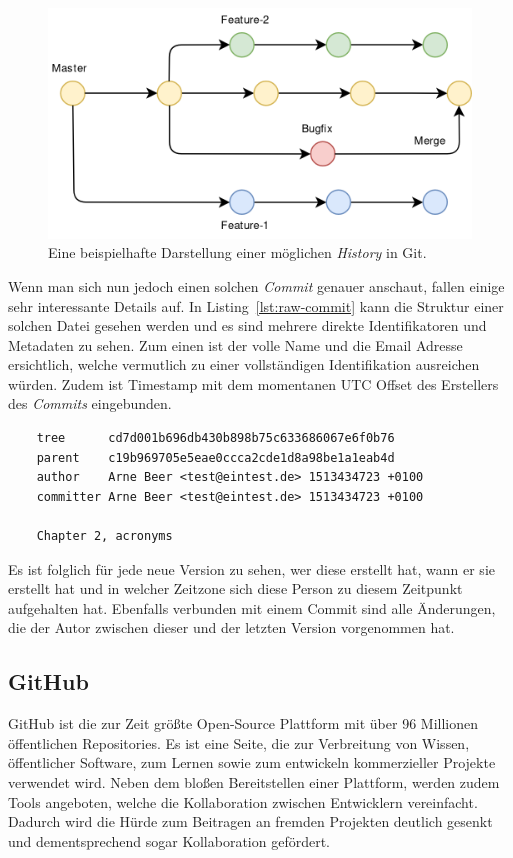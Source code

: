 \documentclass[12pt,a4paper]{scrartcl}
\begin{document}
\begin{figure}[H]
    \includegraphics[scale=0.25]{./gfx/git-history-branch.png}
    \centering
    \caption{Eine beispielhafte Darstellung einer möglichen \emph{History} in Git.}\label{fig:git-history}
\end{figure}

Wenn man sich nun jedoch einen solchen \emph{Commit} genauer anschaut, fallen einige sehr interessante Details auf.
In Listing~\ref{lst:raw-commit} kann die Struktur einer solchen Datei gesehen werden und es sind mehrere direkte Identifikatoren und Metadaten zu sehen.
Zum einen ist der volle Name und die Email Adresse ersichtlich, welche vermutlich zu einer vollständigen Identifikation ausreichen würden.
Zudem ist Timestamp mit dem momentanen UTC Offset des Erstellers des \emph{Commits} eingebunden.

\begin{verbatim}
    tree      cd7d001b696db430b898b75c633686067e6f0b76
    parent    c19b969705e5eae0ccca2cde1d8a98be1a1eab4d
    author    Arne Beer <test@eintest.de> 1513434723 +0100
    committer Arne Beer <test@eintest.de> 1513434723 +0100

    Chapter 2, acronyms
\end{verbatim}
\begingroup
{}
\endgroup

Es ist folglich für jede neue Version zu sehen, wer diese erstellt hat, wann er sie erstellt hat und in welcher Zeitzone sich diese Person zu diesem Zeitpunkt aufgehalten hat.
Ebenfalls verbunden mit einem Commit sind alle Änderungen, die der Autor zwischen dieser und der letzten Version vorgenommen hat.


\subsection{GitHub}
GitHub ist die zur Zeit größte Open-Source Plattform mit über 96 Millionen öffentlichen Repositories.
Es ist eine Seite, die zur Verbreitung von Wissen, öffentlicher Software, zum Lernen sowie zum entwickeln kommerzieller Projekte verwendet wird.
Neben dem bloßen Bereitstellen einer Plattform, werden zudem Tools angeboten, welche die Kollaboration zwischen Entwicklern vereinfacht.
Dadurch wird die Hürde zum Beitragen an fremden Projekten deutlich gesenkt und dementsprechend sogar Kollaboration gefördert.
\end{document}
